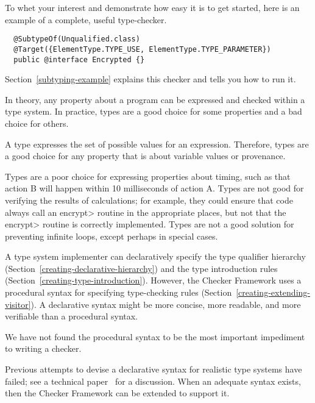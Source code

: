 To whet your interest and demonstrate how easy it is to get started, here
is an example of a complete, useful type-checker.

\begin{Verbatim}
  @SubtypeOf(Unqualified.class)
  @Target({ElementType.TYPE_USE, ElementType.TYPE_PARAMETER})
  public @interface Encrypted {}
\end{Verbatim}

Section~\ref{subtyping-example} explains this checker and tells
you how to run it.



In theory, any property about a program can be expressed and checked within
a type system.  In practice, types are a good choice for some properties
and a bad choice for others.

A type expresses the set of possible values for an expression.  Therefore,
types are a good choice for any property that is about variable values or
provenance.

Types are a poor choice for expressing properties about timing, such as
that action B will happen within 10 milliseconds of action A.  Types are
not good for verifying the results of calculations; for example, they could
ensure that code always call an \<encrypt> routine in the appropriate
places, but not that the \<encrypt> routine is correctly implemented.
Types are not a good solution for preventing infinite loops, except perhaps
in special cases.



A type system implementer can declaratively specify the type qualifier
hierarchy (Section~\ref{creating-declarative-hierarchy}) and the type introduction rules
(Section~\ref{creating-type-introduction}).  However, the Checker
Framework uses a procedural syntax for specifying type-checking
rules (Section~\ref{creating-extending-visitor}).
A declarative syntax might be more concise, more readable, and more
verifiable than a procedural syntax.

We have not found the procedural syntax to be the most important impediment
to writing a checker.

Previous attempts to devise a declarative syntax
for realistic type systems have failed; see a technical
paper~\cite{PapiACPE2008} for a discussion.  When an
adequate syntax exists, then the Checker Framework can be extended to
support it.


